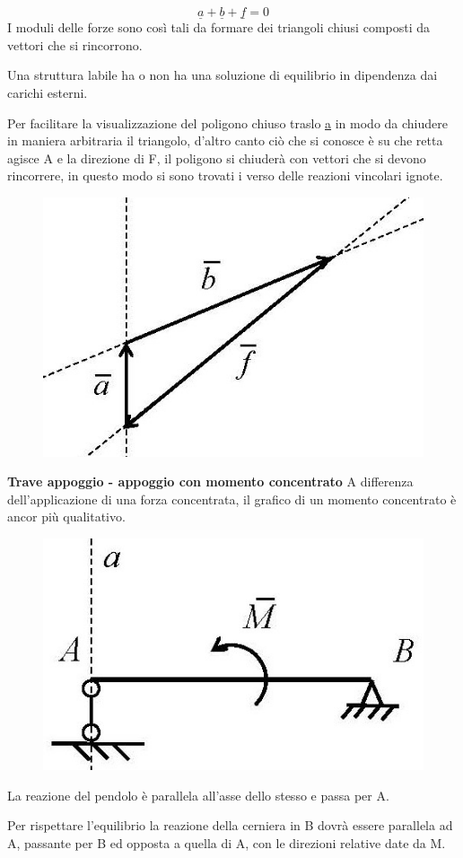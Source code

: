 \documentclass{article}
\begin{document}
\begin{adjustwidth}{2in}{}
\[
\underline{a} + \underline{b} + \underline{f} = 0 
\]
I moduli delle forze sono così tali da formare dei triangoli chiusi composti da vettori che si rincorrono.\newline 

Una struttura labile ha o non ha una soluzione di equilibrio in dipendenza dai carichi esterni. \newline

Per facilitare la visualizzazione del poligono chiuso traslo \underline{a} in modo da chiudere in maniera arbitraria il triangolo, d'altro canto ciò che si conosce è su che retta agisce A e la direzione di F, il poligono si chiuderà con vettori che si devono rincorrere, in questo modo si sono trovati i verso delle reazioni vincolari ignote. 
\begin{figure}[H]
	\centering
	\includegraphics[width=0.4\linewidth]{immagini/1.PARTE4_Pagina_25 (2)}
\end{figure}
\newpage
\textbf{Trave appoggio - appoggio con momento concentrato}\newline
A differenza dell'applicazione di una forza concentrata, il grafico di un momento concentrato è ancor più qualitativo. 
\begin{figure}[H]
	\centering
	\includegraphics[width=0.4\linewidth]{immagini/1.PARTE4_Pagina_25 (3)}
\end{figure}
La reazione del pendolo è parallela all'asse dello stesso e passa per A.

Per rispettare l'equilibrio la reazione della cerniera in B dovrà essere parallela ad A, passante per B ed opposta a quella di A, con le direzioni relative date da M.


\end{adjustwidth}
\end{document}
